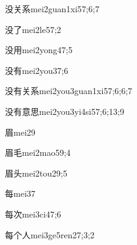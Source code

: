 \begin{verbete}{没关系}{mei2guan1xi5}{7;6;7}
\end{verbete}

\begin{verbete}{没了}{mei2le5}{7;2}
\end{verbete}

\begin{verbete}{没用}{mei2yong4}{7;5}
\end{verbete}

\begin{verbete}{没有}{mei2you3}{7;6}
\end{verbete}

\begin{verbete}{没有关系}{mei2you3guan1xi5}{7;6;6;7}
\end{verbete}

\begin{verbete}{没有意思}{mei2you3yi4si5}{7;6;13;9}
\end{verbete}

\begin{verbete}{眉}{mei2}{9}
\end{verbete}

\begin{verbete}{眉毛}{mei2mao5}{9;4}
\end{verbete}

\begin{verbete}{眉头}{mei2tou2}{9;5}
\end{verbete}

\begin{verbete}{每}{mei3}{7}
\end{verbete}

\begin{verbete}{每次}{mei3ci4}{7;6}
\end{verbete}

\begin{verbete}{每个人}{mei3ge5ren2}{7;3;2}
\end{verbete}

